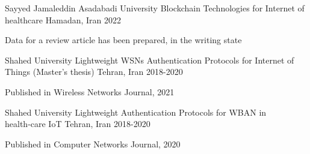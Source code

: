 
\begin{cventries}

  \cventry
  {Sayyed Jamaleddin Asadabadi University} 
  {Blockchain Technologies for Internet of healthcare}
  {Hamadan, Iran} 
  {2022} 
  {
    \begin{cvitems} 
      \item {Data for a review article has been prepared, in the writing state}
    \end{cvitems}
  }

  \cventry
  {Shahed University} 
  {Lightweight WSNs Authentication Protocols for Internet of Things (Master’s thesis)}
  {Tehran, Iran} 
  {2018-2020} 
  {
    \begin{cvitems} 
      \item {Published in Wireless Networks Journal, 2021}
    \end{cvitems}
  }

  \cventry
  {Shahed University} 
  {Lightweight Authentication Protocols for WBAN in health‑care IoT}
  {Tehran, Iran} 
  {2018-2020} 
  {
    \begin{cvitems} 
      \item {Published in Computer Networks Journal, 2020}
    \end{cvitems}
  }


\end{cventries}
